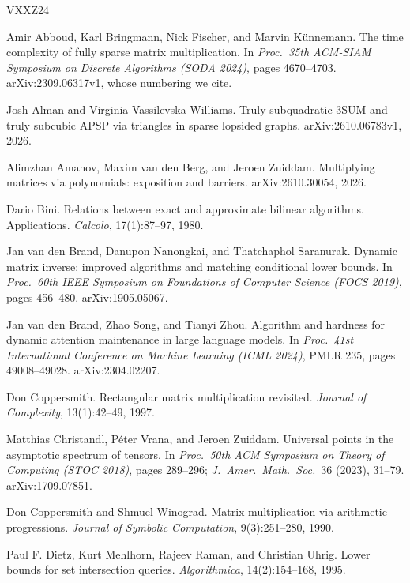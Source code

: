 \documentclass[11pt]{article}
\theoremstyle{definition}
\theoremstyle{remark}
\begin{document}
\begin{thebibliography}{VXXZ24}\setlength{\itemsep}{0pt}

 Amir Abboud, Karl Bringmann, Nick Fischer, and Marvin K\"unnemann. The time complexity of fully sparse matrix multiplication. In \emph{Proc.\ 35th ACM-SIAM Symposium on Discrete Algorithms (SODA 2024)}, pages 4670--4703. arXiv:2309.06317v1, whose numbering we cite.

 Josh Alman and Virginia Vassilevska Williams. Truly subquadratic 3SUM and truly subcubic APSP via triangles in sparse lopsided graphs. arXiv:2610.06783v1, 2026.

 Alimzhan Amanov, Maxim van den Berg, and Jeroen Zuiddam. Multiplying matrices via polynomials: exposition and barriers. arXiv:2610.30054, 2026.

 Dario Bini. Relations between exact and approximate bilinear algorithms. Applications. \emph{Calcolo}, 17(1):87--97, 1980.

 Jan van den Brand, Danupon Nanongkai, and Thatchaphol Saranurak. Dynamic matrix inverse: improved algorithms and matching conditional lower bounds. In \emph{Proc.\ 60th IEEE Symposium on Foundations of Computer Science (FOCS 2019)}, pages 456--480. arXiv:1905.05067.

 Jan van den Brand, Zhao Song, and Tianyi Zhou. Algorithm and hardness for dynamic attention maintenance in large language models. In \emph{Proc.\ 41st International Conference on Machine Learning (ICML 2024)}, PMLR 235, pages 49008--49028. arXiv:2304.02207.

 Don Coppersmith. Rectangular matrix multiplication revisited. \emph{Journal of Complexity}, 13(1):42--49, 1997.

 Matthias Christandl, P\'eter Vrana, and Jeroen Zuiddam. Universal points in the asymptotic spectrum of tensors. In \emph{Proc.\ 50th ACM Symposium on Theory of Computing (STOC 2018)}, pages 289--296; \emph{J.\ Amer.\ Math.\ Soc.}\ 36 (2023), 31--79. arXiv:1709.07851.

 Don Coppersmith and Shmuel Winograd. Matrix multiplication via arithmetic progressions. \emph{Journal of Symbolic Computation}, 9(3):251--280, 1990.

 Paul F. Dietz, Kurt Mehlhorn, Rajeev Raman, and Christian Uhrig. Lower bounds for set intersection queries. \emph{Algorithmica}, 14(2):154--168, 1995.


\end{thebibliography}
\end{document}
